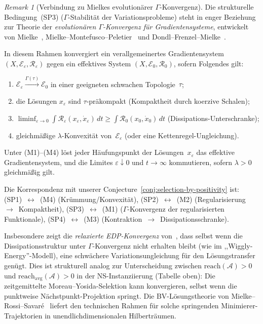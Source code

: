 \documentclass[12pt,a4paper]{article}
\theoremstyle{definition}
\theoremstyle{remark}
\newtheorem{remark}[theorem]{Remark}
\begin{document}
\begin{remark}[Verbindung zu Mielkes evolution\"arer $\Gamma$-Konvergenz]
\label{rem:mielke-edp}
Die strukturelle Bedingung~\textup{(SP3)} ($\Gamma$-Stabilit\"at der Variationsprobleme) steht in enger Beziehung zur Theorie der \emph{evolution\"aren $\Gamma$-Konvergenz f\"ur Gradientensysteme}, entwickelt von Mielke~\cite{Mielke2016}, Mielke--Montefusco--Peletier~\cite{MielkeMontefuscoPeletier2021} und Dondl--Frenzel--Mielke~\cite{DondlFrenzelMielke2019}.

In diesem Rahmen konvergiert ein verallgemeinertes Gradientensystem $(X, \mathcal{E}_\varepsilon, \mathcal{R}_\varepsilon)$ gegen ein effektives System $(X, \mathcal{E}_0, \mathcal{R}_0)$, sofern Folgendes gilt:
\begin{enumerate}
\item[(M1)] $\mathcal{E}_\varepsilon \xrightarrow{\Gamma(\tau)} \mathcal{E}_0$ in einer geeigneten schwachen Topologie~$\tau$;
\item[(M2)] die L\"osungen $x_\varepsilon$ sind $\tau$-pr\"akompakt (Kompaktheit durch koerzive Schalen);
\item[(M3)] $\liminf_{\varepsilon \to 0} \int \mathcal{R}_\varepsilon(x_\varepsilon, \dot{x}_\varepsilon)\,dt \geq \int \mathcal{R}_0(x_0, \dot{x}_0)\,dt$ (Dissipations-Unterschranke);
\item[(M4)] gleichm\"a\ss ige $\lambda$-Konvexit\"at von~$\mathcal{E}_\varepsilon$ (oder eine Kettenregel-Ungleichung).
\end{enumerate}
Unter (M1)--(M4) l\"ost jeder H\"aufungspunkt der L\"osungen~$x_\varepsilon$ das effektive Gradientensystem, und die Limites $\varepsilon \downarrow 0$ und $t \to \infty$ kommutieren, sofern $\lambda > 0$ gleichm\"a\ss ig gilt.

Die Korrespondenz mit unserer Conjecture~\ref{conj:selection-by-positivity} ist:
\textup{(SP1)}~$\leftrightarrow$~\textup{(M4)} (Kr\"ummung/Konvexit\"at), \textup{(SP2)}~$\leftrightarrow$~\textup{(M2)} (Regularisierung~$\to$~Kompaktheit), \textup{(SP3)}~$\leftrightarrow$~\textup{(M1)} ($\Gamma$-Konvergenz der regularisierten Funktionale), \textup{(SP4)}~$\leftrightarrow$~\textup{(M3)} (Kontraktion~$\to$~Dissipationsschranke).

Insbesondere zeigt die \emph{relaxierte EDP-Konvergenz} von~\cite{DondlFrenzelMielke2019}, dass selbst wenn die Dissipationsstruktur unter $\Gamma$-Konvergenz nicht erhalten bleibt (wie im ,,Wiggly-Energy''-Modell), eine schw\"achere Variationsungleichung f\"ur den L\"osungstransfer gen\"ugt. Dies ist strukturell analog zur Unterscheidung zwischen $\mathrm{reach}(\mathcal{A}) > 0$ und $\mathrm{reach}_{\mathrm{avg}}(\mathcal{A}) > 0$ in der NS-Instanziierung (Tabelle oben): Die zeitgemittelte Moreau--Yosida-Selektion kann konvergieren, selbst wenn die punktweise N\"achstpunkt-Projektion springt. Die BV-L\"osungstheorie von Mielke--Rossi--Savar\'e~\cite{MielkeRossiSavare2016} liefert den technischen Rahmen f\"ur solche springenden Minimierer-Trajektorien in unendlichdimensionalen Hilbertr\"aumen.


\end{remark}
\end{document}
